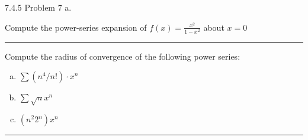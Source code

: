 \documentclass[11pt]{article}
\begin{document}
 7.4.5 Problem 7 a.

Compute the power-series expansion of $f(x) = \frac{x^2}{1-x^2}$ about $x=0$

\hrule








Compute the radius of convergence of the following power series:

\begin{enumerate}[a.]
    \item $\sum (n^4/n!) \cdot x^n$
    \item $\sum \sqrt{n} x^n$
    \item $(n^2 2^n) x^n$
\end{enumerate}

\hrule
\end{document}
